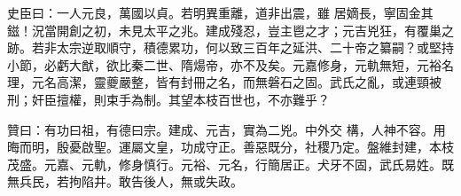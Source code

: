 \begin{pinyinscope}
 史臣曰：一人元良，萬國以貞。若明異重離，道非出震，雖
 居嫡長，寧固金其鎡！況當開創之初，未見太平之兆。建成殘忍，豈主鬯之才；元吉兇狂，有覆巢之跡。若非太宗逆取順守，積德累功，何以致三百年之延洪、二十帝之纂嗣？或堅持小節，必虧大猷，欲比秦二世、隋煬帝，亦不及矣。元嘉修身，元軌無短，元裕名理，元名高潔，靈夔嚴整，皆有封冊之名，而無磐石之固。武氏之亂，或連頸被刑；奸臣擅權，則束手為制。其望本枝百世也，不亦難乎？



 贊曰：有功曰祖，有德曰宗。建成、元吉，實為二兇。中外交
 構，人神不容。用晦而明，殷憂啟聖。運屬文皇，功成守正。善惡既分，社稷乃定。盤維封建，本枝茂盛。元嘉、元軌，修身慎行。元裕、元名，行簡居正。犬牙不固，武氏易姓。既無兵民，若拘陷井。敢告後人，無或失政。



\end{pinyinscope}